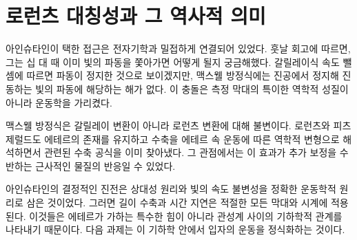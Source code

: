 \begin{classroomqa}\end{classroomqa}

\section{로런츠 대칭성과 그 역사적 의미}

\begin{classroomqa}\end{classroomqa}

아인슈타인이 택한 접근은 전자기학과 밀접하게 연결되어 있었다. 훗날 회고에 따르면, 그는 십 대 때 이미 빛의 파동을 쫓아가면 어떻게 될지 궁금해했다. 갈릴레이식 속도 뺄셈에 따르면 파동이 정지한 것으로 보이겠지만, 맥스웰 방정식에는 진공에서 정지해 진동하는 빛의 파동에 해당하는 해가 없다. 이 충돌은 측정 막대의 특이한 역학적 성질이 아니라 운동학을 가리켰다.

\begin{classroomqa}\end{classroomqa}

맥스웰 방정식은 갈릴레이 변환이 아니라 로런츠 변환에 대해 불변이다. 로런츠와 피츠제럴드도 에테르의 존재를 유지하고 수축을 에테르 속 운동에 따른 역학적 변형으로 해석하면서 관련된 수축 공식을 이미 찾아냈다. 그 관점에서는 이 효과가 추가 보정을 수반하는 근사적인 물질의 반응일 수 있었다.

아인슈타인의 결정적인 진전은 상대성 원리와 빛의 속도 불변성을 정확한 운동학적 원리로 삼은 것이었다. 그러면 길이 수축과 시간 지연은 적절한 모든 막대와 시계에 적용된다. 이것들은 에테르가 가하는 특수한 힘이 아니라 관성계 사이의 기하학적 관계를 나타내기 때문이다. 다음 과제는 이 기하학 안에서 입자의 운동을 정식화하는 것이다.
